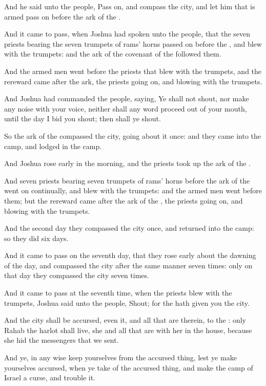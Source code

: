 \verse And he said unto the people, Pass on, and compass the city, and let him that is armed pass on before the ark of the \LORD.

\verse And it came to pass, when Joshua had spoken unto the people, that the seven priests bearing the seven trumpets of rams' horns passed on before the \LORD, and blew with the trumpets: and the ark of the covenant of the \LORD followed them.

\verse And the armed men went before the priests that blew with the trumpets, and the rereward came after the ark, the priests going on, and blowing with the trumpets.

\verse And Joshua had commanded the people, saying, Ye shall not shout, nor make any noise with your voice, neither shall any word proceed out of your mouth, until the day I bid you shout; then shall ye shout.

\verse So the ark of the \LORD compassed the city, going about it once: and they came into the camp, and lodged in the camp.

\verse And Joshua rose early in the morning, and the priests took up the ark of the \LORD.

\verse And seven priests bearing seven trumpets of rams' horns before the ark of the \LORD went on continually, and blew with the trumpets: and the armed men went before them; but the rereward came after the ark of the \LORD, the priests going on, and blowing with the trumpets.

\verse And the second day they compassed the city once, and returned into the camp: so they did six days.

\verse And it came to pass on the seventh day, that they rose early about the dawning of the day, and compassed the city after the same manner seven times: only on that day they compassed the city seven times.

\verse And it came to pass at the seventh time, when the priests blew with the trumpets, Joshua said unto the people, Shout; for the \LORD hath given you the city.

\verse And the city shall be accursed, even it, and all that are therein, to the \LORD: only Rahab the harlot shall live, she and all that are with her in the house, because she hid the messengers that we sent.

\verse And ye, in any wise keep yourselves from the accursed thing, lest ye make yourselves accursed, when ye take of the accursed thing, and make the camp of Israel a curse, and trouble it.

